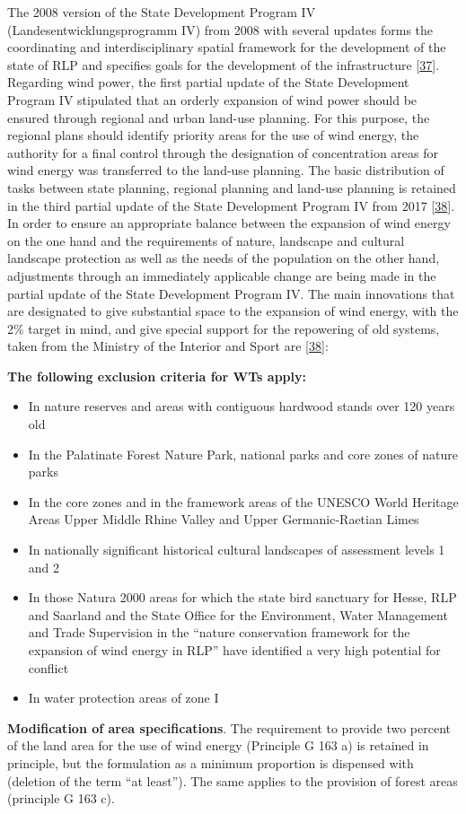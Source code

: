 \documentclass[a4paper,11pt]{article}
\providecommand{\tightlist}{%
  \setlength{\itemsep}{0pt}\setlength{\parskip}{0pt}}
\begin{document}
The 2008 version of the State Development Program IV (Landesentwicklungsprogramm IV) from 2008 with several updates forms the coordinating and interdisciplinary spatial framework for the development of the state of RLP and specifies goals for the development of the infrastructure {[}\protect\hyperlink{ref-MinisteriumdesInnernundfurSport.2008}{37}{]}. Regarding wind power, the first partial update of the State Development Program IV stipulated that an orderly expansion of wind power should be ensured through regional and urban land-use planning. For this purpose, the regional plans should identify priority areas for the use of wind energy, the authority for a final control through the designation of concentration areas for wind energy was transferred to the land-use planning. The basic distribution of tasks between state planning, regional planning and land-use planning is retained in the third partial update of the State Development Program IV from 2017 {[}\protect\hyperlink{ref-MinisteriumdesInnernundfurSport.2017}{38}{]}. In order to ensure an appropriate balance between the expansion of wind energy on the one hand and the requirements of nature, landscape and cultural landscape protection as well as the needs of the population on the other hand, adjustments through an immediately applicable change are being made in the partial update of the State Development Program IV. The main innovations that are designated to give substantial space to the expansion of wind energy, with the 2\% target in mind, and give special support for the repowering of old systems, taken from the Ministry of the Interior and Sport are {[}\protect\hyperlink{ref-MinisteriumdesInnernundfurSport.2017}{38}{]}:

\textbf{The following exclusion criteria for WTs apply:}
\begin{itemize}
\tightlist
\item
  In nature reserves and areas with contiguous hardwood stands over 120 years old
\item
  In the Palatinate Forest Nature Park, national parks and core zones of nature parks
\item
  In the core zones and in the framework areas of the UNESCO World Heritage Areas Upper Middle Rhine Valley and Upper Germanic-Raetian Limes
\item
  In nationally significant historical cultural landscapes of assessment levels 1 and 2
\item
  In those Natura 2000 areas for which the state bird sanctuary for Hesse, RLP and Saarland and the State Office for the Environment, Water Management and Trade Supervision in the ``nature conservation framework for the expansion of wind energy in RLP'' have identified a very high potential for conflict
\item
  In water protection areas of zone I
\end{itemize}
\textbf{Modification of area specifications}. The requirement to provide two percent of the land area for the use of wind energy (Principle G 163 a) is retained in principle, but the formulation as a minimum proportion is dispensed with (deletion of the term ``at least''). The same applies to the provision of forest areas (principle G 163 c).
\end{document}
